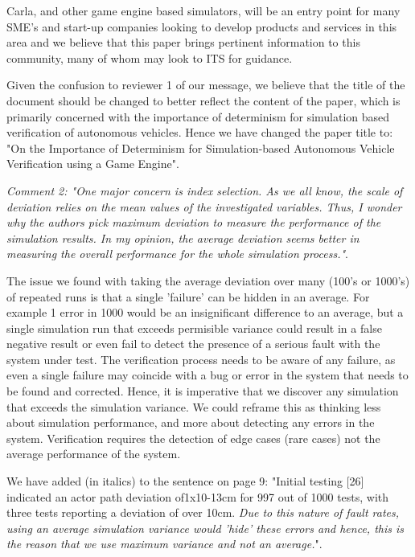 \documentclass[11pt, a4paper]{letter} %
\begin{document}
\begin{letter}
Carla, and other game engine based simulators, will be an entry point for many SME's and start-up companies looking to develop products and services in this area and we believe that this paper brings pertinent information to this community, many of whom may look to ITS for guidance.

Given the confusion to reviewer 1 of our message, we believe that the title of the document should be changed to better reflect the content of the paper, which is primarily concerned with the importance of determinism for simulation based verification of autonomous vehicles. Hence we have changed the paper title to: "On the Importance of Determinism for Simulation-based Autonomous Vehicle Verification using a Game Engine".

\textit{Comment 2: "One major concern is index selection. As we all know, the scale of deviation relies on the mean values of the investigated variables. Thus, I wonder why the authors pick maximum deviation to measure the performance of the simulation results. In my opinion, the average deviation seems better in measuring the overall performance for the whole simulation process."}.

The issue we found with taking the average deviation over many (100's or 1000's) of repeated runs is that a single 'failure' can be hidden in an average. For example 1 error in 1000 would be an insignificant difference to an average, but a single simulation run that exceeds permisible variance could result in a false negative result or even fail to detect the presence of a serious fault with the system under test. The verification process needs to be aware of any failure, as even a single failure may coincide with a bug or error in the system that needs to be found and corrected. Hence, it is imperative that we discover any simulation that exceeds the simulation variance. We could reframe this as thinking less about simulation performance, and more about detecting any errors in the system. Verification requires the detection of edge cases (rare cases) not the average performance of the system.

We have added (in italics) to the sentence on page 9:  "Initial testing [26] indicated an actor path deviation of1x10-13cm for 997 out of 1000 tests, with three tests reporting a deviation of over 10cm. \textit{Due to this nature of fault rates, using an average simulation variance would 'hide' these errors and hence, this is the reason that we use maximum variance and not an average.}". 






\end{letter}
\end{document}
